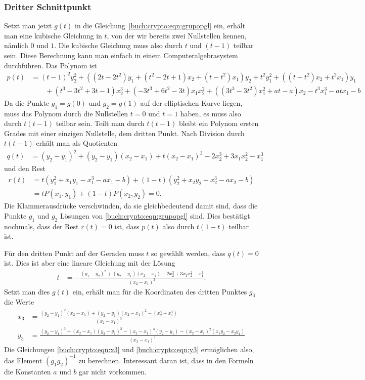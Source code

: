 \subsubsection{Dritter Schnittpunkt}
Setzt man jetzt $g(t)$ in die Gleichung~\eqref{buch:crypto:eqn:grupopgl}
ein, erhält man eine kubische
Gleichung in $t$, von der wir bereits zwei Nullstellen kennen, nämlich 
$0$ und $1$.
Die kubische Gleichung muss also durch $t$ und $(t-1)$ teilbar sein.
Diese Berechnung kann man einfach in einem Computeralgebrasystem
durchführen.
Das Polynom ist
\begin{align*}
p(t)
&=
(t-1)^2y_2^2
+
((2t-2t^2) y_1 +(t^2-2t+1)x_2 + (t-t^2)x_1)y_2
+
t^2y_1^2
+
((t-t^2)x_2+t^2 x_1)y_1
\\
&\qquad
+
(t^3-3t^2+3t-1)x_2^3
+
(-3 t^3+6t^2-3t)x_1x_2^2
+
((3t^3-3t^2)x_1^2+at-a)x_2
-
t^3x_1^3
-
atx_1-b
\end{align*}
Da die Punkte $g_1=g(0)$ und $g_2=g(1)$ auf der elliptischen Kurve
liegen, muss das Polynom durch die Nullstellen $t=0$ und $t=1$
haben, es muss also durch $t(t-1)$ teilbar sein.
Teilt man durch $t(t-1)$ bleibt ein Polynom ersten Grades mit
einer einzigen Nullstelle, dem dritten Punkt.
Nach Division durch $t(t-1)$ erhält man als Quotienten
\begin{align}
q(t)
&=
(y_2-y_1)^2 
+
(y_2-y_1) (x_2-x_1)
+
t(x_2-x_1)^3
-
2x_2^3+3x_1x_2^2-x_1^3
\label{buch:ecc:eqn:q(t)}
\end{align}
und den Rest
\begin{align*}
r(t)
&=
t(y_1^2+x_1y_1-x_1^3-ax_1-b)
+
(1-t)(y_2^2+x_2y_2-x_2^3-ax_2-b)
\\
&=
tP(x_1,y_1)
+
(1-t)P(x_2,y_2)
=
0.
\end{align*}
Die Klammerausdrücke verschwinden, da sie gleichbedeutend damit sind,
dass die Punkte $g_1$ und $g_2$ Lösungen von
\eqref{buch:crypto:eqn:grupopgl} sind.
Dies bestätigt nochmals, dass der Rest $r(t)=0$ ist, dass $p(t)$
also durch $t(1-t)$ teilbar ist.

Für den dritten Punkt auf der Geraden muss $t$ so gewählt werden, dass
$q(t)=0$ ist.
Dies ist aber eine lineare Gleichung mit der Lösung
\begin{align*}
t
&=
-\frac{
(y_1-y_2)^2
+
(y_2-y_1)(x_2-x_1)
-2x_2^3+3x_1x_2^2-x_1^3
}{(x_2-x_1)^3}
.
\end{align*}
Setzt man dies $g(t)$ ein, erhält man für die Koordinaten des dritten
Punktes $g_3$ die Werte
\begin{align}
x_3
&=
\frac{
(y_2-y_1)^2(x_2-x_1) + (y_2-y_1)(x_2-x_1)^2
-(x_2^4+x_1^4)
}{
(x_2-x_1)^3
}
\label{buch:crypto:eqn:x3}
\\
y_3
&=
\frac{
(y_2-y_1)^3
+(x_2-x_1)(y_2-y_1)^2
-(x_{2}-x_{1})^3 ( y_{2} - y_{1})
-(x_{2}-x_{1})^2 ( x_{1} y_{2}- x_{2} y_{1})
}{
(x_2-x_1)^3
}
\label{buch:crypto:eqn:y3}
\end{align}
Die Gleichungen 
\eqref{buch:crypto:eqn:x3}
und
\eqref{buch:crypto:eqn:y3}
ermöglichen also, das Element $(g_1g_2)^{-1}$ zu berechnen.
Interessant daran ist, dass in den Formeln die Konstanten $a$ und $b$ 
gar nicht vorkommen.

